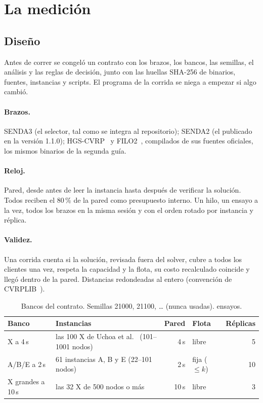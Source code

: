\documentclass[11pt,a4paper]{article}
\newcommand{\sendados}{SENDA2}
\newcommand{\sendatres}{SENDA3}
\begin{document}
\section{La medición}
\label{sec:medicion}

\subsection{Diseño}

Antes de correr se congeló un contrato con los brazos, los bancos, las semillas, el análisis y las
reglas de decisión, junto con las huellas SHA-256 de binarios, fuentes, instancias y scripts. El
programa de la corrida se niega a empezar si algo cambió.

\paragraph{Brazos.} \sendatres{} (el selector, tal como se integra al repositorio); \sendados{} (el
publicado en la versión 1.1.0); HGS-CVRP~\cite{vidal2022hgs} y FILO2~\cite{accorsi2023}, compilados de
sus fuentes oficiales, los mismos binarios de la segunda guía.

\paragraph{Reloj.} Pared, desde antes de leer la instancia hasta después de verificar la solución.
Todos reciben el 80\,\% de la pared como presupuesto interno. Un hilo, un ensayo a la vez, todos los
brazos en la misma sesión y con el orden rotado por instancia y réplica.

\paragraph{Validez.} Una corrida cuenta si la solución, revisada fuera del solver, cubre a todos los
clientes una vez, respeta la capacidad y la flota, su costo recalculado coincide y llegó dentro de la
pared. Distancias redondeadas al entero (convención de CVRPLIB~\cite{cvrplib}).

\begin{table}[H]
\centering
\caption{Bancos del contrato. Semillas 21000, 21100, \ldots{} (nunca usadas). \EnsayosContrato{} ensayos.}
\label{tab:bancos}
\small
\begin{tabular}{@{}llrlr@{}}
\toprule
Banco & Instancias & Pared & Flota & Réplicas \\
\midrule
X a 4\,s & las 100 X de Uchoa et al.~\cite{uchoa2017} (101--1001 nodos) & 4\,s & libre & 5 \\
A/B/E a 2\,s & 61 instancias A, B y E (22--101 nodos) & 2\,s & fija ($\le k$) & 10 \\
X grandes a 10\,s & las 32 X de 500 nodos o más & 10\,s & libre & 3 \\
\bottomrule
\end{tabular}
\end{table}
\end{document}
